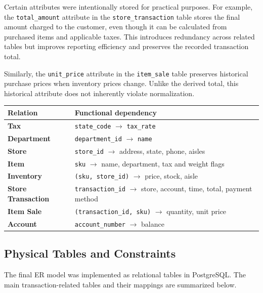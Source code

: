 \documentclass[11pt,letterpaper]{article}
\begin{document}
Certain attributes were intentionally stored for practical purposes. For example, the \texttt{total\_amount} attribute in the \texttt{store\_transaction} table stores the final amount charged to the customer, even though it can be calculated from purchased items and applicable taxes. This introduces redundancy across related tables but improves reporting efficiency and preserves the recorded transaction total.

Similarly, the \texttt{unit\_price} attribute in the \texttt{item\_sale} table preserves historical purchase prices when inventory prices change. Unlike the derived total, this historical attribute does not inherently violate normalization.



\renewcommand{\arraystretch}{1.16}
\begin{center}
\footnotesize
\begin{tabularx}{\textwidth}{@{}>{\bfseries}p{}>{\raggedright\arraybackslash}X@{}}
\hline
Relation & Functional dependency \\ \hline
Tax & \texttt{state\_code} $\rightarrow$ \texttt{tax\_rate} \\
Department & \texttt{department\_id} $\rightarrow$ \texttt{name} \\
Store & \texttt{store\_id} $\rightarrow$ address, state, phone, aisles \\
Item & \texttt{sku} $\rightarrow$ name, department, tax and weight flags \\
Inventory & \texttt{(sku, store\_id)} $\rightarrow$ price, stock, aisle \\
Store Transaction & \texttt{transaction\_id} $\rightarrow$ store, account, time, total, payment method \\
Item Sale & \texttt{(transaction\_id, sku)} $\rightarrow$ quantity, unit price \\
Account & \texttt{account\_number} $\rightarrow$ balance \\ \hline
\end{tabularx}
\end{center}




\subsection{Physical Tables and Constraints}

The final ER model was implemented as relational tables in PostgreSQL. The main transaction-related tables and their mappings are summarized below.
\end{document}
